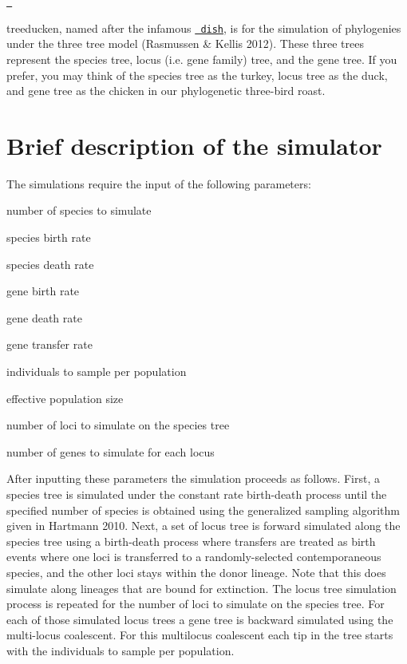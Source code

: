 \href{https://travis-ci.com/wadedismukes/treeducken}{\texttt{ }}

treeducken, named after the infamous \href{https://en.wikipedia.org/wiki/Turducken}{\texttt{ dish}}, is for the simulation of phylogenies under the three tree model (Rasmussen \& Kellis 2012). These three trees represent the species tree, locus (i.\+e. gene family) tree, and the gene tree. If you prefer, you may think of the species tree as the turkey, locus tree as the duck, and gene tree as the chicken in our phylogenetic three-\/bird roast.





\section*{Brief description of the simulator}

The simulations require the input of the following parameters\+:


\begin{DoxyItemize}
\item number of species to simulate
\item species birth rate
\item species death rate
\item gene birth rate
\item gene death rate
\item gene transfer rate
\item individuals to sample per population
\item effective population size
\item number of loci to simulate on the species tree
\item number of genes to simulate for each locus
\end{DoxyItemize}

After inputting these parameters the simulation proceeds as follows. First, a species tree is simulated under the constant rate birth-\/death process until the specified number of species is obtained using the generalized sampling algorithm given in Hartmann 2010. Next, a set of locus tree is forward simulated along the species tree using a birth-\/death process where transfers are treated as birth events where one loci is transferred to a randomly-\/selected contemporaneous species, and the other loci stays within the donor lineage. Note that this does simulate along lineages that are bound for extinction. The locus tree simulation process is repeated for the number of loci to simulate on the species tree. For each of those simulated locus trees a gene tree is backward simulated using the multi-\/locus coalescent. For this multilocus coalescent each tip in the tree starts with the individuals to sample per population.

